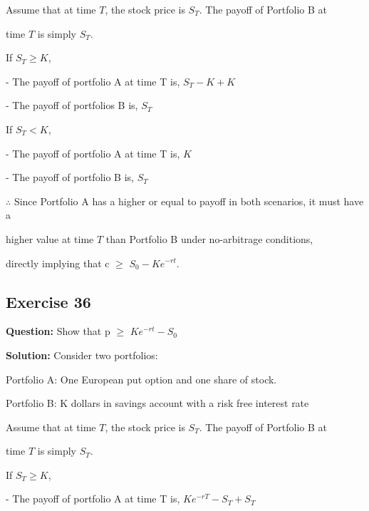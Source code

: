 \documentclass{article}
\begin{document}
Assume that at time \( T \), the stock price is \( S_T \). The payoff of Portfolio B at 

time \( T \) is simply \( S_T \).

\vspace{\baselineskip}


If \( S_T \geq K \),

- The payoff of portfolio A at time T is, \( S_T - K + K \)

- The payoff of portfolios B is, $S_T$ 

If \( S_T < K \),

- The payoff of portfolio A at time T is, \( K \)

- The payoff of portfolio B is, \( S_T \)



\vspace{\baselineskip}

$\therefore$ Since Portfolio A has a higher or equal to payoff in both scenarios, it must have a 

higher value at time \( T \) than Portfolio B under no-arbitrage conditions, 

directly implying that c $\geq$ $S_{0} -Ke^{-rt}$.

\subsection*{Exercise 36}

\textbf{Question:} Show that p $\geq$ $Ke^{-rt} - S_{0}$
 
\textbf{Solution:}
Consider two portfolios:

\vspace{\baselineskip}

Portfolio A: One European put option and one share of stock.

Portfolio B: K dollars in savings account with a risk free interest rate

\vspace{\baselineskip}

Assume that at time \( T \), the stock price is \( S_T \). The payoff of Portfolio B at 

time \( T \) is simply \( S_T \).

\vspace{\baselineskip}


If \( S_T \geq K \),

- The payoff of portfolio A at time T is, \( Ke^{-rT} - S_T + S_T \)
\end{document}
